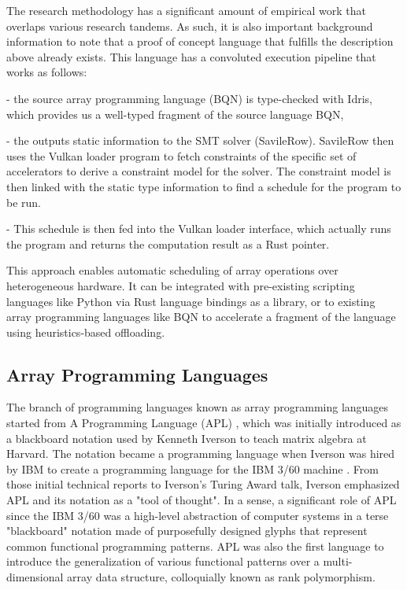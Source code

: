 \documentclass[10pt,a4paper]{article}
\begin{document}
The research methodology has a significant amount of empirical work that overlaps various research tandems. As such, it is also important background information to note that a proof of concept language that fulfills the description above already exists. This language has a convoluted execution pipeline that works as follows: 

- the source array programming language (BQN) is type-checked with Idris, which provides us a well-typed fragment of the source language BQN,

- the outputs static information to the SMT solver (SavileRow). SavileRow then uses the Vulkan loader program to fetch constraints of the specific set of accelerators to derive a constraint model for the solver. The constraint model is then linked with the static type information to find a schedule for the program to be run. 

- This schedule is then fed into the Vulkan loader interface, which actually runs the program and returns the computation result as a Rust pointer.

This approach enables automatic scheduling of array operations over heterogeneous hardware. It can be integrated with pre-existing scripting languages like Python via Rust language bindings as a library, or to existing array programming languages like BQN to accelerate a fragment of the language using heuristics-based offloading.

\subsection{Array Programming Languages}

The branch of programming languages known as array programming languages started from A Programming Language (APL) \cite{iverson1962programming}, which was initially introduced as a blackboard notation used by Kenneth Iverson to teach matrix algebra at Harvard. 
The notation became a programming language when Iverson was hired by IBM to create a programming language for the IBM 3/60 machine \cite{falkoff1964formal}. 
From those initial technical reports to Iverson's Turing Award talk, Iverson emphasized APL and its notation as a "tool of thought". 
In a sense, a significant role of APL since the IBM 3/60 was a high-level abstraction of computer systems in a terse "blackboard" notation made of purposefully designed glyphs that represent common functional programming patterns. 
APL was also the first language to introduce the generalization of various functional patterns over a multi-dimensional array data structure, colloquially known as rank polymorphism.
\end{document}
